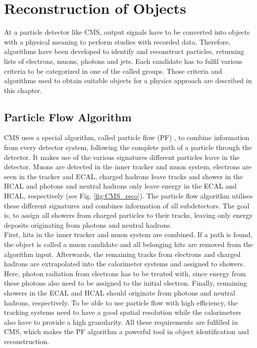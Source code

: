 \chapter{Reconstruction of Objects}
\label{ch:Reco}
	At a particle detector like CMS, output signals have to be converted into objects with a physical meaning to perform studies with recorded data. Therefore, algorithms have been developed to identify and reconstruct particles, returning lists of electrons, muons, photons and jets. Each candidate has to fulfil various criteria to be categorized in one of the called groups. Those criteria and algorithms used to obtain suitable objects for a physics approach are described in this chapter.

\section{Particle Flow Algorithm}
\label{sec:pf}
	CMS uses a special algorithm, called particle flow (PF) \cite{particleflow}, to combine information from every detector system, following the complete path of a particle through the detector. It makes use of the various signatures different particles leave in the detector. Muons are detected in the inner tracker and muon system, electrons are seen in the tracker and ECAL, charged hadrons leave tracks and shower in the HCAL and photons and neutral hadrons only leave energy in the ECAL and HCAL, respectively (see Fig. \ref{fig:CMS_reco}). The particle flow algorithm utilises these different signatures and combines information of all subdetectors. The goal is, to assign all showers from charged particles to their tracks, leaving only energy deposits originating from photons and neutral hadrons.\\
	First, hits in the inner tracker and muon system are combined. If a path is found, the object is called a muon candidate and all belonging hits are removed from the algorithm input. Afterwards, the remaining tracks from electrons and charged hadrons are extrapolated into the calorimeter systems and assigned to showers. Here, photon radiation from electrons has to be treated with, since energy from these photons also need to be assigned to the initial electron. Finally, remaining showers in the ECAL and HCAL should originate from photons and neutral hadrons, respectively. To be able to use particle flow with high efficiency, the tracking systems need to have a good spatial resolution while the calorimeters also have to provide a high granularity. All these requirements are fulfilled in CMS, which makes the PF algorithm a powerful tool in object identification and reconstruction.

